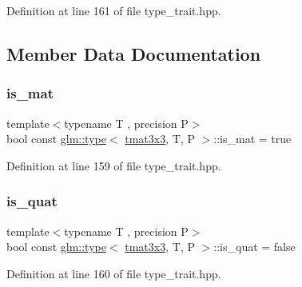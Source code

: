 Definition at line 161 of file type\+\_\+trait.\+hpp.



\subsection{Member Data Documentation}
\mbox{\label{structglm_1_1type_3_01tmat3x3_00_01_t_00_01_p_01_4_abade54049ccd6c552a1cfe659f0b9eca}} 
\subsubsection{\texorpdfstring{is\_mat}{is\_mat}}
{\footnotesize\ttfamily template$<$typename T , precision P$>$ \\
bool const \mbox{\hyperlink{structglm_1_1type}{glm\+::type}}$<$ \mbox{\hyperlink{structglm_1_1tmat3x3}{tmat3x3}}, T, P $>$\+::is\+\_\+mat = true\hspace{0.3cm}{\ttfamily [static]}}



Definition at line 159 of file type\+\_\+trait.\+hpp.

\mbox{\label{structglm_1_1type_3_01tmat3x3_00_01_t_00_01_p_01_4_aadc0f3be5741fd1f33813e2390400b3a}} 
\subsubsection{\texorpdfstring{is\_quat}{is\_quat}}
{\footnotesize\ttfamily template$<$typename T , precision P$>$ \\
bool const \mbox{\hyperlink{structglm_1_1type}{glm\+::type}}$<$ \mbox{\hyperlink{structglm_1_1tmat3x3}{tmat3x3}}, T, P $>$\+::is\+\_\+quat = false\hspace{0.3cm}{\ttfamily [static]}}



Definition at line 160 of file type\+\_\+trait.\+hpp.

\mbox{\label{structglm_1_1type_3_01tmat3x3_00_01_t_00_01_p_01_4_ad3a93969cb5d00ea024e5defb5379f37}} 
